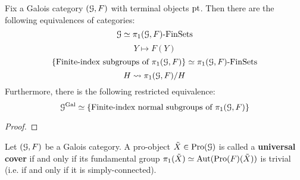         \begin{proposition} \label{prop: categorical_galois_correspondence}
            Fix a Galois category $(\mathcal{G}, F)$ with terminal objects $\mathrm{pt}$. Then there are the following equivalences of categories:
                $$\mathcal{G} \simeq \pi_1(\mathcal{G}, F)\text{-}\mathrm{Fin}\mathrm{Sets}$$
                $$Y \mapsto F(Y)$$
                $$\{\text{Finite-index subgroups of $\pi_1(\mathcal{G}, F)$}\} \simeq \pi_1(\mathcal{G}, F)\text{-}\mathrm{Fin}\mathrm{Sets}$$
                $$H \leadsto \pi_1(\mathcal{G}, F)/H$$
            Furthermore, there is the following restricted equivalence:
                $$\mathcal{G}^{\mathrm{Gal}} \simeq \{\text{Finite-index normal subgroups of $\pi_1(\mathcal{G}, F)$}\}$$
        \end{proposition}
            \begin{proof}
            \end{proof}
            
        \begin{definition} \label{def: universal_covers}
            Let $(\mathcal{G}, F)$ be a Galois category. A pro-object $\tilde{X} \in \mathrm{Pro}(\mathcal{G})$ is called a \textbf{universal cover} if and only if its fundamental group $\pi_1(\tilde{X}) \simeq \mathrm{Aut}(\mathrm{Pro}(F)(\tilde{X}))$ is trivial (i.e. if and only if it is simply-connected).
        \end{definition}
        \begin{remark} \label{remark: fundamental_groups_are_automorphism_groups_of_universal_covers}
            
        \end{remark}
        
